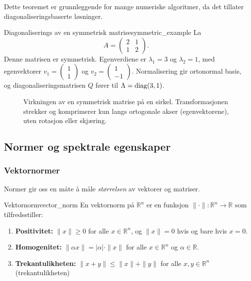 Dette teoremet er grunnleggende for mange numeriske algoritmer, da det tillater diagonaliseringsbaserte løsninger.

\begin{example}{Diagonaliserings av en symmetrisk matrise}{symmetric_example}
	La
	\[
		A = \begin{pmatrix} 2 & 1 \\ 1 & 2 \end{pmatrix}.
	\]
	Denne matrisen er symmetrisk. Egenverdiene er $\lambda_1 = 3$ og $\lambda_2 = 1$, med egenvektorer $v_1 = \begin{pmatrix} 1 \\ 1 \end{pmatrix}$ og $v_2 = \begin{pmatrix} 1 \\ -1 \end{pmatrix}$. Normalisering gir ortonormal basis, og diagonaliseringsmatrisen $Q$ fører til $\Lambda = \operatorname{diag}(3, 1)$.
\end{example}

\begin{figure}
	\centering
	
	\caption{Virkningen av en symmetrisk matrise på en sirkel. Transformasjonen strekker og komprimerer kun langs ortogonale akser (egenvektorene), uten rotasjon eller skjæring.}
	\label{fig:symmetric_action}
\end{figure}

\subsection{Normer og spektrale egenskaper}

\subsubsection{Vektornormer}
Normer gir oss en måte å måle \emph{størrelsen} av vektorer og matriser.

\begin{definition}{Vektornorm}{vector_norm}
	En vektornorm på $\mathbb{R}^n$ er en funksjon $\|\cdot\| : \mathbb{R}^n \to \mathbb{R}$ som tilfredsstiller:
	\begin{enumerate}
		\item \textbf{Positivitet:} $\|x\| \geq 0$ for alle $x \in \mathbb{R}^n$, og $\|x\| = 0$ hvis og bare hvis $x = 0$.
		\item \textbf{Homogenitet:} $\|\alpha x\| = |\alpha| \cdot \|x\|$ for alle $x \in \mathbb{R}^n$ og $\alpha \in \mathbb{R}$.
		\item \textbf{Trekantulikheten:} $\|x + y\| \leq \|x\| + \|y\|$ for alle $x,y \in \mathbb{R}^n$ (trekantulikheten)
	\end{enumerate}
\end{definition}

